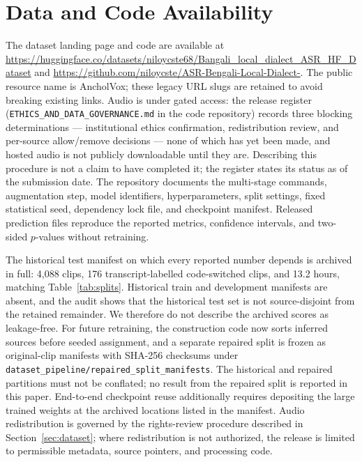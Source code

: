 \documentclass[journal]{IEEEtran}
\begin{document}
\section*{Data and Code Availability}

The dataset landing page and code are available at
\url{https://huggingface.co/datasets/niloycste68/Bangali_local_dialect_ASR_HF_Dataset}
and \url{https://github.com/niloycste/ASR-Bengali-Local-Dialect-}. The public
resource name is AncholVox; these legacy URL slugs are retained to avoid
breaking existing links. Audio is
under gated access: the release register (\texttt{ETHICS\_AND\_DATA\_GOVERNANCE.md}
in the code repository) records three blocking determinations --- institutional
ethics confirmation, redistribution review, and per-source allow/remove
decisions --- none of which has yet been made, and hosted audio is not publicly
downloadable until they are. Describing this procedure is not a claim to have
completed it; the register states its status as of the submission date. The repository
documents the multi-stage commands, augmentation step, model identifiers,
hyperparameters, split settings, fixed statistical seed, dependency lock file,
and checkpoint manifest. Released prediction files reproduce the reported
metrics, confidence intervals, and two-sided $p$-values without retraining.

The historical test manifest on which every reported number depends is archived
in full: 4{,}088 clips, 176 transcript-labelled code-switched clips, and 13.2
hours, matching Table~\ref{tab:splits}. Historical train and development
manifests are absent, and the audit shows that the historical test set is not
source-disjoint from the retained remainder. We therefore do not describe the
archived scores as leakage-free. For future retraining, the construction code
now sorts inferred sources before seeded assignment, and a separate repaired
split is frozen as original-clip manifests with SHA-256 checksums under
\texttt{dataset\_pipeline/repaired\_split\_manifests}. The historical and
repaired partitions must not be conflated; no result from the repaired split is
reported in this paper.
End-to-end checkpoint reuse additionally requires depositing the large trained
weights at the archived locations listed in the manifest. Audio redistribution
is governed by the rights-review procedure described in Section~\ref{sec:dataset};
where redistribution is not authorized, the release is limited to permissible
metadata, source pointers, and processing code.







\end{document}

